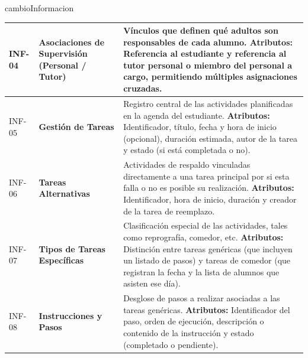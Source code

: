 \begin{cambiocontenido}{cambioInformacion}
\begin{longtable}{|>{\raggedright\arraybackslash}p{1.5cm}|>{\raggedright\arraybackslash}p{4.0cm}|>{\raggedright\arraybackslash}p{9.0cm}|}
INF-04 & \textbf{Asociaciones de Supervisión (Personal / Tutor)} & Vínculos que definen qué adultos son responsables de cada alumno. \textbf{Atributos:} Referencia al estudiante y referencia al tutor personal o miembro del personal a cargo, permitiendo múltiples asignaciones cruzadas. \\
\hline

INF-05 & \textbf{Gestión de Tareas} & Registro central de las actividades planificadas en la agenda del estudiante. \textbf{Atributos:} Identificador, título, fecha y hora de inicio (opcional), duración estimada, autor de la tarea y estado (si está completada o no). \\
\hline

INF-06 & \textbf{Tareas Alternativas} & Actividades de respaldo vinculadas directamente a una tarea principal por si esta falla o no es posible su realización. \textbf{Atributos:} Identificador, hora de inicio, duración y creador de la tarea de reemplazo. \\
\hline

INF-07 & \textbf{Tipos de Tareas Específicas} & Clasificación especial de las actividades, tales como reprografía, comedor, etc. \textbf{Atributos:} Distinción entre tareas genéricas (que incluyen un listado de pasos) y tareas de comedor (que registran la fecha y la lista de alumnos que asisten ese día). \\
\hline

INF-08 & \textbf{Instrucciones y Pasos} & Desglose de pasos a realizar asociadas a las tareas genéricas. \textbf{Atributos:} Identificador del paso, orden de ejecución, descripción o contenido de la instrucción y estado (completado o pendiente). \\
\hline

\end{longtable}
\endgroup


\end{cambiocontenido}
